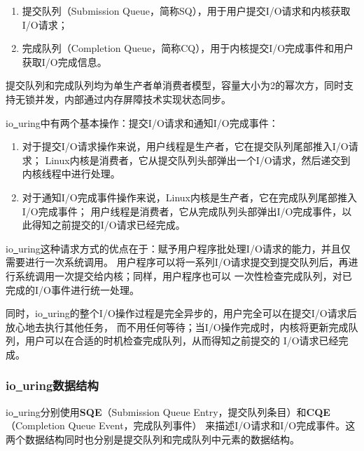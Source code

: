 \documentclass[supercite]{HustGraduPaper}
\theoremstyle{definition}
\begin{document}
\begin{enumerate}
  \item 提交队列（Submission Queue，简称SQ），用于用户提交I/O请求和内核获取I/O请求；
  \item 完成队列（Completion Queue，简称CQ），用于内核提交I/O完成事件和用户获取I/O完成信息。
\end{enumerate}

提交队列和完成队列均为单生产者单消费者模型，容量大小为2的幂次方，同时支持无锁并发，内部通过内存屏障技术实现状态同步。\par

io\underline{~}uring中有两个基本操作：提交I/O请求和通知I/O完成事件：
\begin{enumerate}
  \item 对于提交I/O请求操作来说，用户线程是生产者，它在提交队列尾部推入I/O请求；
    Linux内核是消费者，它从提交队列头部弹出一个I/O请求，然后递交到内核线程中进行处理。
  \item 对于通知I/O完成事件操作来说，Linux内核是生产者，它在完成队列尾部推入I/O完成事件；
    用户线程是消费者，它从完成队列头部弹出I/O完成事件，以此得知之前提交的I/O请求已经完成。
\end{enumerate}

io\underline{~}uring这种请求方式的优点在于：赋予用户程序批处理I/O请求的能力，并且仅需要进行一次系统调用。
用户程序可以将一系列I/O请求提交到提交队列后，再进行系统调用一次提交给内核；同样，用户程序也可以
一次性检查完成队列，对已完成的I/O事件进行统一处理。\par

同时，io\underline{~}uring的整个I/O操作过程是完全异步的，用户完全可以在提交I/O请求后放心地去执行其他任务，
而不用任何等待；当I/O操作完成时，内核将更新完成队列，用户可以在合适的时机检查完成队列，从而得知之前提交的
I/O请求已经完成。\par

\subsubsection{io\underline{~}uring数据结构}
io\underline{~}uring分别使用\textbf{SQE}（Submission Queue Entry，提交队列条目）和\textbf{CQE}（Completion Queue Event，完成队列事件）
来描述I/O请求和I/O完成事件。这两个数据结构同时也分别是提交队列和完成队列中元素的数据结构。\par
\end{document}
